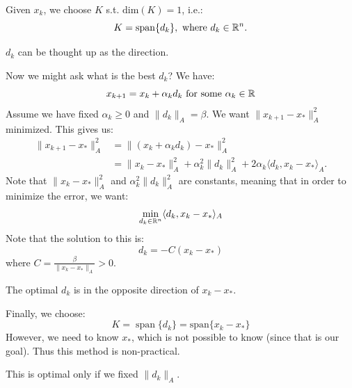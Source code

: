 \documentclass[../main/main.tex]{subfiles}
\begin{document}
Given $x_{k}$, we choose $K$  s.t. $\text{dim}(K)=1$, i.e.: \[
K = \operatorname{span}\{d_{k}\}, \text{ where }d_{k} \in \mathbb{R} ^{n}.
\]
\begin{remark}
 $d_{k}$ can be thought up as the direction.
\end{remark}
Now we might ask what is the best $d_{k}$? We have: \[
x_{k+1} = x_{k} + \alpha _{k}d_{k} \text{ for some } \alpha_{k} \in \mathbb{R}
\]Assume we have fixed $\alpha_{k}\geq  0 $ and $\|d_{k}\|_{A}=\beta $. We want $\|x_{k+1}- x_{*}\|_{A}^2$ minimized. This gives us: \[
\]
\begin{align*}
  \|x_{k+1} - x_{*}\|_{A}^2 &= \|(x_{k}+\alpha_{k}d_{k}) - x_{*}\|^2_{A} \\
  &= \| x_{k}- x_{*}\|^2_{A} + \alpha _{k}^2 \|d_{k}\|^2_{A} + 2\alpha _{k}\langle d_{k}, x_{k}-x_{*}\rangle_{A}
  .\end{align*}
Note that $\| x_{k}- x_{*}\|^2_{A}$ and $\alpha _{k}^2 \|d_{k}\|^2_{A}$ are constants, meaning that in order to minimize the error, we want: \[
\min_{d_{k}\in \mathbb{R} ^{n}}  \langle d_{k}, x_{k}-x_{*}\rangle_{A}
\]
Note that the solution to this is: \[
d_{k} = -C (x_{k}-x_{*})
\] where $C = \frac{\beta}{\|x_{k}-x_{*}\|_{A}} >0$.
\begin{remark}
The optimal $d_{k}$ is in the opposite direction of $x_{k}-x_{*}$.
\end{remark}
Finally, we choose: \[
K = \operatorname{span}\{d_{k}\} = \text{span}\{x_{k}-x_{*}\}
\]
However, we need to know $x_{*}$, which is not possible to know (since that is our goal). Thus this method is non-practical.
\begin{remark}
This is optimal only if we fixed $\|d_{k}\|_{A}$.
\end{remark}
\end{document}
